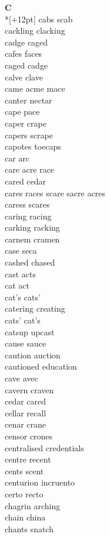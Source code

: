 \vspace{14pt}
\noindent\textbf{\Large C}\\*[+12pt]
cabs scab\\
cackling clacking\\
cadge caged\\
cafes faces\\
caged cadge\\
calve clave\\
came acme mace\\
canter nectar\\
cape pace\\
caper crape\\
capers scrape\\
capotes toecaps\\
car arc\\
care acre race\\
cared cedar\\
cares races scare sacre acres\\
caress scares\\
caring racing\\
carking racking\\
carnem cramen\\
case seca\\
cashed chased\\
cast acts\\
cat act\\
cat's cats'\\
catering creating\\
cats' cat's\\
catsup upcast\\
cause sauce\\
caution auction\\
cautioned education\\
cave avec\\
cavern craven\\
cedar cared\\
cellar recall\\
cenar crane\\
censor crones\\
centralised credentials\\
centre recent\\
cents scent\\
centurion incruento\\
certo recto\\
chagrin arching\\
chain china\\
chants snatch\\
